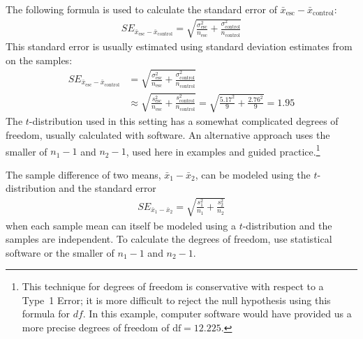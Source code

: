 The following formula is used to calculate the standard error of $\bar{x}_{\text{esc}} - \bar{x}_{\text{control}}$:
\begin{eqnarray*}
SE_{\bar{x}_{\text{esc}} - \bar{x}_{\text{control}}} = \sqrt{\frac{\sigma_{\text{esc}}^2}{n_{\text{esc}}} + \frac{\sigma_{\text{control}}^2}{n_{\text{control}}}}
\end{eqnarray*}
This standard error is usually estimated using standard deviation estimates from on the samples:
\begin{align*}
SE_{\bar{x}_{\text{esc}} - \bar{x}_{\text{control}}}
	&= \sqrt{\frac{\sigma_{\text{esc}}^2}{n_{\text{esc}}} + \frac{\sigma_{\text{control}}^2}{n_{\text{control}}}} \\
	&\approx \sqrt{\frac{s_{\text{esc}}^2}{n_{\text{esc}}} + \frac{s_{\text{control}}^2}{n_{\text{control}}}}
	= \sqrt{\frac{5.17^2}{9} + \frac{2.76^2}{9}} = 1.95
\end{align*}
The $t$-distribution used in this setting has a somewhat complicated degrees of freedom, usually calculated with software.  An alternative approach uses the smaller of $n_1 - 1$ and $n_2 - 1$, used here in  examples and guided practice.\footnote{This technique for degrees of freedom is conservative with respect to a Type~1 Error; it is more difficult to reject the null hypothesis using this formula for $df$. In this example, computer software would have provided us a more precise degrees of freedom of $\text{df} = 12.225$.}

\begin{termBox}{
The sample difference of two means, $\bar{x}_1 - \bar{x}_2$, can be modeled using the $t$-distribution and the standard error
\begin{eqnarray}
\textstyle
SE_{\bar{x}_{1} - \bar{x}_{2}} = \sqrt{\frac{s_1^2}{n_1} + \frac{s_2^2}{n_2}}
\label{seOfDifferenceInMeans}
\end{eqnarray}
when each sample mean can itself be modeled using a $t$-distribution and the samples are independent. To calculate the degrees of freedom, use statistical software or the smaller of $n_1 - 1$ and $n_2 - 1$.}
\end{termBox}\textC{\vspace{-10mm}}

